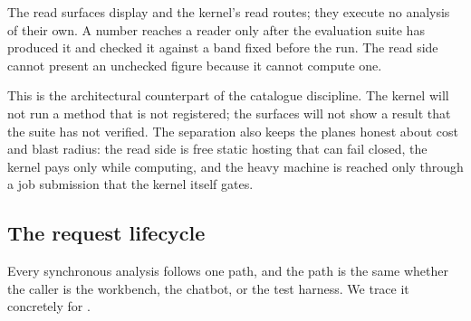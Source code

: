\begin{principle}
\label{prin:render-verified}
The read surfaces display  and the kernel's read routes; they
execute no analysis of their own. A number reaches a reader only after the
evaluation suite has produced it and checked it against a band fixed before the run.
The read side cannot present an unchecked figure because it cannot compute one.
\end{principle}

This is the architectural counterpart of the catalogue discipline. The kernel will
not run a method that is not registered; the surfaces will not show a result that
the suite has not verified. The separation also keeps the planes honest about cost
and blast radius: the read side is free static hosting that can fail closed, the
kernel pays only while computing, and the heavy machine is reached only through a
job submission that the kernel itself gates.

\subsection{The request lifecycle}
\label{sec:lifecycle}

Every synchronous analysis follows one path, and the path is the same whether the
caller is the workbench, the chatbot, or the test harness. We trace it concretely
for .

